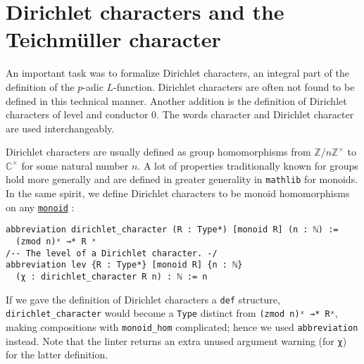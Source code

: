 \documentclass[a4paper,UKenglish,cleveref, autoref, thm-restate,pdfa]{lipics-v2021}
\newcommand{\lean}[1]{\texttt{#1}\xspace} %
\begin{document}
\section{Dirichlet characters and the Teichmüller character}
\label{dirchar}
An important task was to formalize Dirichlet characters, an integral part of the definition of the $p$-adic $L$-function. 
Dirichlet characters are often not found to be defined in this technical manner. Another addition is the definition of 
Dirichlet characters of level and conductor 0. The words character and Dirichlet character are used interchangeably. 

Dirichlet characters are usually defined as group homomorphisms from $\mathbb{Z}/n \mathbb{Z}^{\times}$ to $\mathbb{C}^{\times}$ for some natural number $n$. 
A lot of properties traditionally known for groups hold more generally and are defined in greater generality in \lean{mathlib} for monoids. In the same spirit, 
we define Dirichlet characters to be monoid homomorphisms on any \href{https://leanprover-community.github.io/mathlib_docs/algebra/group/defs.html#monoid}{\lean{monoid}} :
\begin{lstlisting}
abbreviation dirichlet_character (R : Type*) [monoid R] (n : ℕ) := 
  (zmod n)ˣ →* R ˣ 
/-- The level of a Dirichlet character. -/
abbreviation lev {R : Type*} [monoid R] {n : ℕ} 
  (χ : dirichlet_character R n) : ℕ := n
\end{lstlisting}
If we gave the definition of Dirichlet characters a \lean{def} structure, 
\lean{dirichlet\_character} would become a \lean{Type} distinct from \lean{(zmod n)ˣ →* Rˣ}, 
making compositions with \lean{monoid\_hom} complicated; hence we used \lean{abbreviation} instead. 
Note that the linter returns an extra unused argument warning (for \lean{χ}) for the latter definition. 
\end{document}
